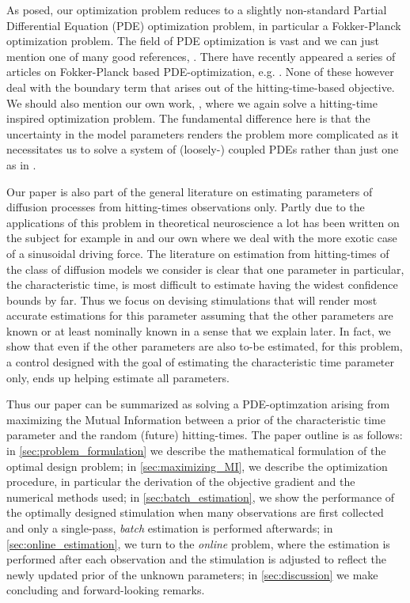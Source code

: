 As posed, our optimization problem reduces to a slightly non-standard Partial
Differential Equation (PDE) optimization problem, in particular a Fokker-Planck
optimization problem. The field of PDE optimization is vast and we can just
mention one of many good references, \cite{Borzi2012}. There have recently
appeared a series of articles on Fokker-Planck based PDE-optimization, e.g.
\cite{Annunziato2010,Annunziato2014}. None of these however deal with the
boundary term that arises out of the hitting-time-based objective. We
should also mention our own work, \cite{Iolov2014a}, where we again solve a
hitting-time inspired optimization problem. The fundamental difference here is
that the uncertainty in the model parameters renders the problem more
complicated as it necessitates us to solve a system of (loosely-) coupled PDEs
rather than just one as in \cite{Iolov2014a}.

Our paper is also part of the general literature on estimating parameters of
diffusion processes from hitting-times observations only. Partly due to the
applications of this problem in theoretical neuroscience a lot has been written
on the subject for example in
\cite{Ditlevsen2007,MullowneyIyengar2008,Alili2005} and our own \cite{Iolov2013}
where we deal with the more exotic case of a sinusoidal driving force. The
literature on estimation from hitting-times of the class of diffusion models we
consider is clear that one parameter in particular, the characteristic time, is
most difficult to estimate having the widest confidence bounds by far. Thus we
focus on devising stimulations that will render most accurate estimations for
this parameter assuming that the other parameters are known or at least
nominally known in a sense that we explain later. In fact, we show that even if
the other parameters are also to-be estimated, for this problem, a control
designed with the goal of estimating the characteristic time parameter only,
ends up helping estimate all parameters.  

Thus our paper can be summarized as solving a PDE-optimzation arising from
maximizing the Mutual Information between a prior of the characteristic time
parameter and the random (future) hitting-times. The paper outline is as
follows: in \cref{sec:problem_formulation} we describe the mathematical formulation of the optimal design problem; in
\cref{sec:maximizing_MI}, we describe the optimization procedure, in particular
the derivation of the objective gradient and the numerical methods used; in
\cref{sec:batch_estimation}, we show the performance of the optimally designed
stimulation when many observations are first collected and only a single-pass,
{\sl batch} estimation is performed afterwards; in \cref{sec:online_estimation},
we turn to the {\sl online} problem, where the estimation is performed
after each observation and the stimulation is adjusted to reflect the newly
updated prior of the unknown parameters; in \cref{sec:discussion} we make
concluding and forward-looking remarks.

